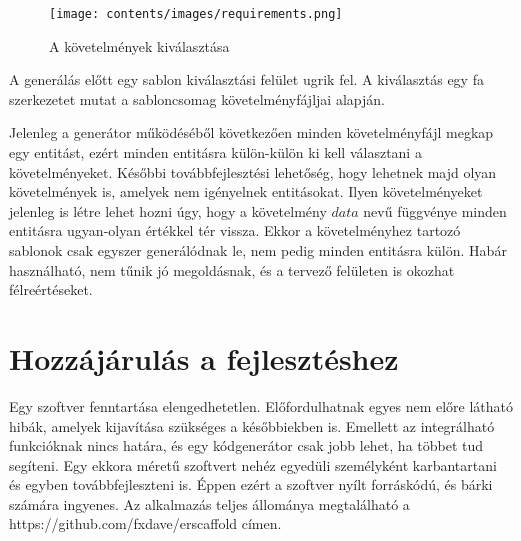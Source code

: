 \documentclass[a4paper,12pt,oneside]{report}
\begin{document}
\newpage

\begin{figure}[H]
	\texttt{[image: contents/images/requirements.png]}
	\caption{A követelmények kiválasztása}
	\label{fig:requirements}
\end{figure}

\begin{justify}
	A generálás előtt egy sablon kiválasztási felület ugrik fel. A kiválasztás egy fa szerkezetet mutat a sabloncsomag követelményfájljai alapján.

	Jelenleg a generátor működéséből következően minden követelményfájl megkap egy entitást, ezért minden entitásra külön-külön ki kell választani a követelményeket. Későbbi továbbfejlesztési lehetőség, hogy lehetnek majd olyan követelmények is, amelyek nem igényelnek entitásokat. Ilyen követelményeket jelenleg is létre lehet hozni úgy, hogy a követelmény $data$ nevű függvénye minden entitásra ugyan-olyan értékkel tér vissza. Ekkor a követelményhez tartozó sablonok csak egyszer generálódnak le, nem pedig minden entitásra külön. Habár használható, nem tűnik jó megoldásnak, és a tervező felületen is okozhat félreértéseket.

\end{justify}

\clearpage
\section{Hozzájárulás a fejlesztéshez}
\begin{justify}
	Egy szoftver fenntartása elengedhetetlen. Előfordulhatnak egyes nem előre látható hibák, amelyek kijavítása szükséges a későbbiekben is. Emellett az integrálható funkcióknak nincs határa, és egy kódgenerátor csak jobb lehet, ha többet tud segíteni. Egy ekkora méretű szoftvert nehéz egyedüli személyként karbantartani és egyben továbbfejleszteni is. Éppen ezért a szoftver nyílt forráskódú, és bárki számára ingyenes. Az alkalmazás teljes állománya megtalálható a https://github.com/fxdave/erscaffold címen.
\end{justify}
\end{document}
